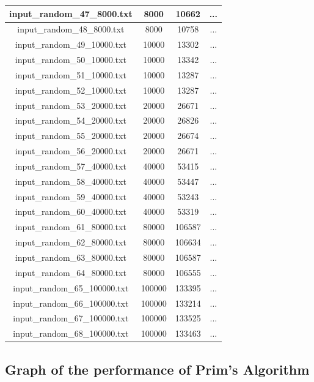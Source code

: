 \begin{longtable}{|c|c|c|c|}
		input\_random\_47\_8000.txt & 8000 & 10662 & ... \\ \hline
		input\_random\_48\_8000.txt & 8000 & 10758 & ... \\ \hline
		input\_random\_49\_10000.txt & 10000 & 13302 & ... \\ \hline
		input\_random\_50\_10000.txt & 10000 & 13342 & ... \\ \hline
		input\_random\_51\_10000.txt & 10000 & 13287 & ... \\ \hline
		input\_random\_52\_10000.txt & 10000 & 13287 & ... \\ \hline
		input\_random\_53\_20000.txt & 20000 & 26671 & ... \\ \hline
		input\_random\_54\_20000.txt & 20000 & 26826 & ... \\ \hline
		input\_random\_55\_20000.txt & 20000 & 26674 & ... \\ \hline
		input\_random\_56\_20000.txt & 20000 & 26671 & ... \\ \hline
		input\_random\_57\_40000.txt & 40000 & 53415 & ... \\ \hline
		input\_random\_58\_40000.txt & 40000 & 53447 & ... \\ \hline
		input\_random\_59\_40000.txt & 40000 & 53243 & ... \\ \hline
		input\_random\_60\_40000.txt & 40000 & 53319 & ... \\ \hline
		input\_random\_61\_80000.txt & 80000 & 106587 & ... \\ \hline
		input\_random\_62\_80000.txt & 80000 & 106634 & ... \\ \hline
		input\_random\_63\_80000.txt & 80000 & 106587 & ... \\ \hline
		input\_random\_64\_80000.txt & 80000 & 106555 & ... \\ \hline
		input\_random\_65\_100000.txt & 100000 & 133395 & ... \\ \hline
		input\_random\_66\_100000.txt & 100000 & 133214 & ... \\ \hline
		input\_random\_67\_100000.txt & 100000 & 133525 & ... \\ \hline
		input\_random\_68\_100000.txt & 100000 & 133463 & ... \\ \hline
	\end{longtable}

\pagebreak

\subsection{Graph of the performance of Prim's Algorithm }

